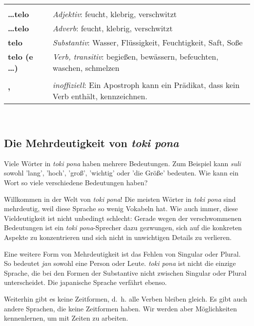 \begin{supertabular}{p{2,5cm}|ll}
 && \\ %
%
\textbf{\dots telo} && \textit{Adjektiv}: feucht, klebrig, verschwitzt \\ %
\textbf{\dots telo} && \textit{Adverb}: feucht, klebrig, verschwitzt \\ %
\textbf{telo} && \textit{Substantiv}: Wasser, Flüssigkeit, Feuchtigkeit, Saft, Soße \\ %
\textbf{telo (e \dots)} && \textit{Verb, transitiv}: begießen, bewässern, befeuchten, waschen, schmelzen \\ %
 && \\ %
%
\textbf{'} && \textit{inoffiziell}: Ein Apostroph kann ein Prädikat, dass kein Verb enthält, kennzeichnen. \\ %
\end{supertabular} \\
%
\newpage
%
\subsection*{Die Mehrdeutigkeit von \textit{toki pona}}
%
%
Viele Wörter in \textit{toki pona} haben mehrere Bedeutungen. 
Zum Beispiel kann \textit{suli} sowohl 'lang', 'hoch', 'groß', 'wichtig' oder 'die Größe' bedeuten. 
Wie kann ein Wort so viele verschiedene Bedeutungen haben?

Willkommen in der Welt von \textit{toki pona}! 
Die meisten Wörter in \textit{toki pona} sind mehrdeutig, weil diese Sprache so wenig Vokabeln hat.
Wie auch immer, diese Vieldeutigkeit ist nicht unbedingt schlecht: 
Gerade wegen der verschwommenen Bedeutungen ist ein \textit{toki pona}-Sprecher dazu gezwungen, sich auf die konkreten Aspekte zu konzentrieren und sich nicht in unwichtigen Details zu verlieren.

Eine weitere Form von Mehrdeutigkeit ist das Fehlen von Singular oder Plural. 
So bedeutet \textit{jan} sowohl eine Person oder Leute. 
\textit{toki pona} ist nicht die einzige Sprache, die bei den Formen der Substantive
nicht zwischen Singular oder Plural unterscheidet. 
Die japanische Sprache verfährt ebenso. 

Weiterhin gibt es keine Zeitformen, d.~h. alle Verben bleiben gleich.
Es gibt auch andere Sprachen, die keine Zeitformen haben.
Wir werden aber Möglichkeiten kennenlernen, um mit Zeiten zu arbeiten.

